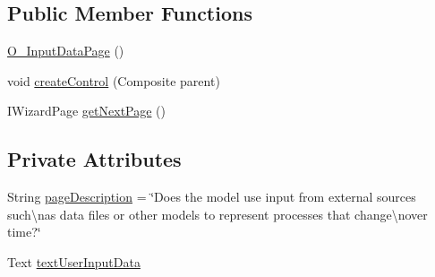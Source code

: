 \subsection*{Public Member Functions}
\begin{DoxyCompactItemize}
\item 
\hyperlink{classit_1_1isislab_1_1masonassisteddocumentation_1_1mason_1_1wizards_1_1_o___input_data_page_a299edc8514b4a51bd2a2a9837fa75d34}{O\-\_\-\-Input\-Data\-Page} ()
\item 
void \hyperlink{classit_1_1isislab_1_1masonassisteddocumentation_1_1mason_1_1wizards_1_1_o___input_data_page_a27d7a5546b1ff8655849716cbc7e4e06}{create\-Control} (Composite parent)
\item 
I\-Wizard\-Page \hyperlink{classit_1_1isislab_1_1masonassisteddocumentation_1_1mason_1_1wizards_1_1_o___input_data_page_a8673b81ff5b2f6533ab9f5b87c99ed07}{get\-Next\-Page} ()
\end{DoxyCompactItemize}
\subsection*{Private Attributes}
\begin{DoxyCompactItemize}
\item 
String \hyperlink{classit_1_1isislab_1_1masonassisteddocumentation_1_1mason_1_1wizards_1_1_o___input_data_page_a392593dd5fd3ca9cf1ff07ab170a884e}{page\-Description} = \char`\"{}Does the model use input from external sources such\textbackslash{}nas data files or other models to represent processes that change\textbackslash{}nover time?\char`\"{}
\item 
Text \hyperlink{classit_1_1isislab_1_1masonassisteddocumentation_1_1mason_1_1wizards_1_1_o___input_data_page_add92b759816c704809eed977d5b343c5}{text\-User\-Input\-Data}
\end{DoxyCompactItemize}


